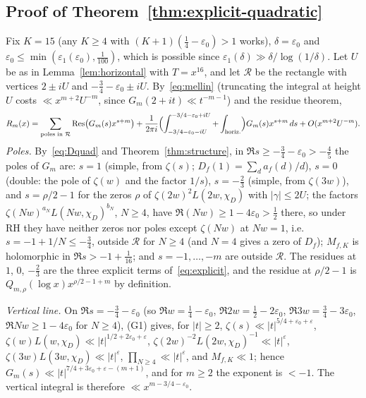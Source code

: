 \documentclass[11pt,a4paper]{article}
\theoremstyle{remark}\newtheorem{remark}[theorem]{Remark}
\begin{document}
\subsection{Proof of Theorem~\ref{thm:explicit-quadratic}}

Fix $K=15$ (any $K\ge4$ with $(K+1)(\tfrac14-\varepsilon_0)>1$ works), $\delta=\varepsilon_0$ and
$\varepsilon_0\le\min(\varepsilon_1(\varepsilon_0),\tfrac1{100})$, which is possible since $\varepsilon_1(\delta)\gg\delta/\log(1/\delta)$.
Let $U$ be as in Lemma~\ref{lem:horizontal} with $T=x^{16}$, and let $\mathcal R$
be the rectangle with vertices $2\pm iU$ and $-\tfrac34-\varepsilon_0\pm iU$. By~\eqref{eq:mellin} (truncating the
integral at height $U$ costs $\ll x^{m+2}U^{-m}$, since $G_m(2+it)\ll t^{-m-1}$) and the residue theorem,
\[
R_m(x)=\sum_{\text{poles in }\mathcal R}\operatorname*{Res}\bigl(G_m(s)x^{s+m}\bigr)+\frac1{2\pi i}\Bigl(\int_{-3/4-\varepsilon_0-iU}^{-3/4-\varepsilon_0+iU}+\int_{\text{horiz.}}\Bigr)G_m(s)x^{s+m}\,ds+O(x^{m+2}U^{-m}).
\]
\emph{Poles.} By~\eqref{eq:Dquad} and Theorem~\ref{thm:structure}, in $\Re s\ge-\tfrac34-\varepsilon_0>-\tfrac45$
the poles of $G_m$ are: $s=1$ (simple, from $\zeta(s)$; $D_f(1)=\sum_da_f(d)/d$), $s=0$ (double: the pole of
$\zeta(w)$ and the factor $1/s$), $s=-\tfrac23$ (simple, from $\zeta(3w)$), and $s=\rho/2-1$ for the zeros $\rho$
of $\zeta(2w)^2L(2w,\chi_D)$ with $|\gamma|\le2U$; the factors $\zeta(Nw)^{a_N}L(Nw,\chi_D)^{b_N}$, $N\ge4$, have
$\Re(Nw)\ge1-4\varepsilon_0>\tfrac12$ there, so under RH they have neither zeros nor poles except
$\zeta(Nw)$ at $Nw=1$, i.e.\ $s=-1+1/N\le-\tfrac34$, outside $\mathcal R$ for $N\ge4$ (and $N=4$ gives a zero
of $D_f$); $M_{f,K}$ is holomorphic in $\Re s>-1+\tfrac1{16}$; and $s=-1,\dots,-m$ are outside $\mathcal R$.
The residues at $1$, $0$, $-\tfrac23$ are the three explicit terms of~\eqref{eq:explicit}, and the residue at
$\rho/2-1$ is $Q_{m,\rho}(\log x)x^{\rho/2-1+m}$ by definition.

\emph{Vertical line.} On $\Re s=-\tfrac34-\varepsilon_0$ (so $\Re w=\tfrac14-\varepsilon_0$, $\Re2w=\tfrac12-2\varepsilon_0$,
$\Re3w=\tfrac34-3\varepsilon_0$, $\Re Nw\ge1-4\varepsilon_0$ for $N\ge4$), (G1) gives, for $|t|\ge2$,
$\zeta(s)\ll|t|^{5/4+\varepsilon_0+\varepsilon}$, $\zeta(w)L(w,\chi_D)\ll|t|^{1/2+2\varepsilon_0+\varepsilon}$,
$\zeta(2w)^{-2}L(2w,\chi_D)^{-1}\ll|t|^{\varepsilon}$, $\zeta(3w)L(3w,\chi_D)\ll|t|^\varepsilon$,
$\prod_{N\ge4}\ll|t|^{\varepsilon}$, and $M_{f,K}\ll1$; hence $G_m(s)\ll|t|^{7/4+3\varepsilon_0+\varepsilon-(m+1)}$, and
for $m\ge2$ the exponent is $<-1$. The vertical integral is therefore $\ll x^{m-3/4-\varepsilon_0}$.
\end{document}
